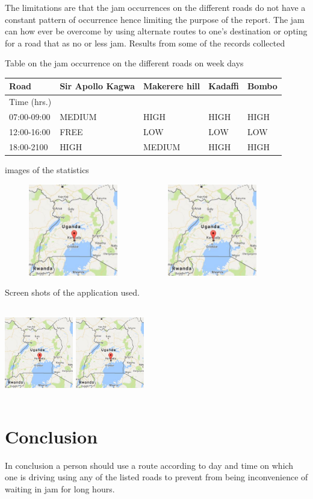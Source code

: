\documentclass[options]{article}
\begin{document}
The limitations are that the jam occurrences on the different roads do not have a constant pattern of occurrence hence limiting the purpose of the report.
The jam can how ever be overcome by using alternate routes to one’s destination or opting for a road that as no or less jam.
Results from some of the records collected 


Table on the jam occurrence on the different roads on week days

\begin{tabular}{|l|l|l|l|l|}
\hline
Road& Sir Apollo Kagwa & Makerere hill & Kadaffi & Bombo \\
\hline
Time (hrs.) &  & & & \\
\hline
07:00-09:00& MEDIUM &HIGH&HIGH&HIGH \\
\hline
12:00-16:00 &FREE  & LOW&LOW & LOW\\
\hline
18:00-2100&HIGH  &MEDIUM & HIGH& HIGH\\
\hline

\end{tabular}
  
images of the statistics 

\includegraphics[width =6cm,height=4cm]{Captuhhre.JPG}
\includegraphics[width =6cm,height=4cm]{Captuhhre.JPG}

Screen shots of the application used.

\includegraphics[width =3cm,height=4cm]{Captuhhre.JPG}
\includegraphics[width =3cm,height=4cm]{Captuhhre.JPG}

\section{\textbf{Conclusion }} 
In conclusion a person should use a route according to day and time on which one is driving using any of the listed roads to prevent from being inconvenience of waiting in jam for long hours.
\end{document}
